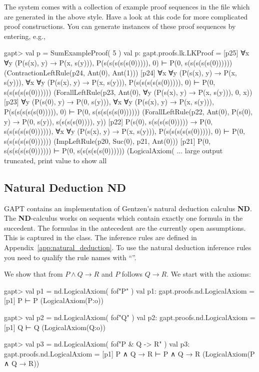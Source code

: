 \documentclass[a4paper,11pt]{book}
\newcommand{\impl}{\to} %
\renewcommand{\land}{\wedge}
\newcommand{\ND}{\textbf{ND}}
\newcommand{\cli}[1]{{\ttfamily {#1}}}
\begin{document}
The system comes with a collection of example proof sequences in the file
\cli{examples/ProofSequences.scala} which are generated in the above style.
Have a look at this code for more complicated proof constructions.
You can generate instances of these proof sequences by entering, e.g.,
\begin{clilisting}
  gapt> val p = SumExampleProof( 5 )
  val p: gapt.proofs.lk.LKProof = [p25] ∀x ∀y (P(s(x), y) → P(x, s(y))), P(s(s(s(s(s(0))))), 0) ⊢ P(0, s(s(s(s(s(0))))))    (ContractionLeftRule(p24, Ant(0), Ant(1)))
  [p24] ∀x ∀y (P(s(x), y) → P(x, s(y))),
  ∀x ∀y (P(s(x), y) → P(x, s(y))),
  P(s(s(s(s(s(0))))), 0)
  ⊢
  P(0, s(s(s(s(s(0))))))    (ForallLeftRule(p23, Ant(0), ∀y (P(s(x), y) → P(x, s(y))), 0, x))
  [p23] ∀y (P(s(0), y) → P(0, s(y))),
  ∀x ∀y (P(s(x), y) → P(x, s(y))),
  P(s(s(s(s(s(0))))), 0)
  ⊢
  P(0, s(s(s(s(s(0))))))    (ForallLeftRule(p22, Ant(0), P(s(0), y) → P(0, s(y)), s(s(s(s(0)))), y))
  [p22] P(s(0), s(s(s(s(0))))) → P(0, s(s(s(s(s(0)))))),
  ∀x ∀y (P(s(x), y) → P(x, s(y))),
  P(s(s(s(s(s(0))))), 0)
  ⊢
  P(0, s(s(s(s(s(0))))))    (ImpLeftRule(p20, Suc(0), p21, Ant(0)))
  [p21] P(0, s(s(s(s(s(0)))))) ⊢ P(0, s(s(s(s(s(0))))))    (LogicalAxiom( ... large output truncated, print value to show all

\end{clilisting}

\subsection{Natural Deduction ND}

GAPT contains an implementation of Gentzen's natural deduction calculus {\ND}.
The {\ND}-calculus works on sequents which contain exactly one formula in the succedent.
The formulas in the antecedent are the currently open assumptions. This is captured
in the \cli{NDSequent} class. The inference rules are defined in Appendix~\ref{app:natural_deduction}.
To use the natural deduction inference rules you need to qualify the rule names with ``\cli{nd.}''.

We show that from $P \land Q \impl R$ and $P$ follows $Q \impl R$. We start with
the axioms:

\begin{clilisting}
  gapt> val p1 = nd.LogicalAxiom( fof"P" )
  val p1: gapt.proofs.nd.LogicalAxiom = [p1] P ⊢ P    (LogicalAxiom(P:o))

  gapt> val p2 = nd.LogicalAxiom( fof"Q" )
  val p2: gapt.proofs.nd.LogicalAxiom = [p1] Q ⊢ Q    (LogicalAxiom(Q:o))

  gapt> val p3 = nd.LogicalAxiom( fof"P & Q -> R" )
  val p3: gapt.proofs.nd.LogicalAxiom = [p1] P ∧ Q → R ⊢ P ∧ Q → R    (LogicalAxiom(P ∧ Q → R))

\end{clilisting}
\end{document}
